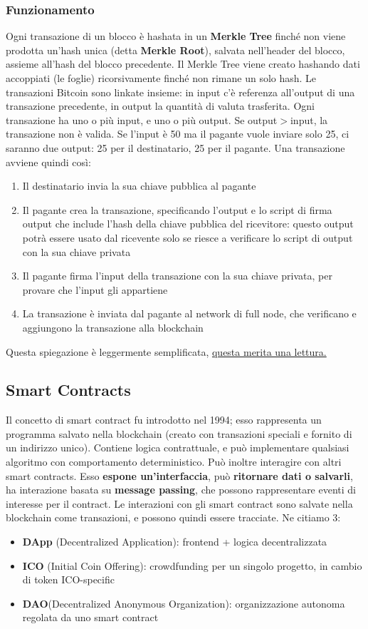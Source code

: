 \documentclass[11pt]{article}
\begin{document}
\subsubsection{Funzionamento}
Ogni transazione di un blocco è hashata in un \textbf{Merkle Tree} finché non viene prodotta un'hash unica (detta \textbf{Merkle Root}), salvata nell'header del blocco, assieme all'hash del blocco precedente. Il Merkle Tree viene creato hashando dati accoppiati (le foglie) ricorsivamente finché non rimane un solo hash. Le transazioni Bitcoin sono linkate insieme: in input c'è referenza all'output di una transazione precedente, in output la quantità di valuta trasferita. Ogni transazione ha uno o più input, e uno o più output. Se output$>$input, la transazione non è valida. Se l'input è 50 ma il pagante vuole inviare solo 25, ci saranno due output: 25 per il destinatario, 25 per il pagante. Una transazione avviene quindi così:
\begin{enumerate}
    \item Il destinatario invia la sua chiave pubblica al pagante
    \item Il pagante crea la transazione, specificando l'output e lo script di firma output che include l'hash della chiave pubblica del ricevitore: questo output potrà essere usato dal ricevente solo se riesce a verificare lo script di output con la sua chiave privata
    \item Il pagante firma l'input della transazione con la sua chiave privata, per provare che l'input gli appartiene
    \item La transazione è inviata dal pagante al network di full node, che verificano e aggiungono la transazione alla blockchain
\end{enumerate}
Questa spiegazione è leggermente semplificata, \href{https://en.bitcoin.it/wiki/Transaction}{questa merita una lettura.}
\subsection{Smart Contracts}
Il concetto di smart contract fu introdotto nel 1994; esso rappresenta un programma salvato nella blockchain (creato con transazioni speciali e fornito di un indirizzo unico). Contiene logica contrattuale, e può implementare qualsiasi algoritmo con comportamento deterministico. Può inoltre interagire con altri smart contracts. Esso \textbf{espone un'interfaccia}, può \textbf{ritornare dati o salvarli}, ha interazione basata su \textbf{message passing}, che possono rappresentare eventi di interesse per il contract. Le interazioni con gli smart contract sono salvate nella blockchain come transazioni, e possono quindi essere tracciate. Ne citiamo 3:
\begin{itemize}
    \item \textbf{DApp} (Decentralized Application): frontend + logica decentralizzata 
    \item \textbf{ICO} (Initial Coin Offering): crowdfunding per un singolo progetto, in cambio di token ICO-specific
    \item \textbf{DAO}(Decentralized Anonymous Organization): organizzazione autonoma regolata da uno smart contract
\end{itemize}
\end{document}
